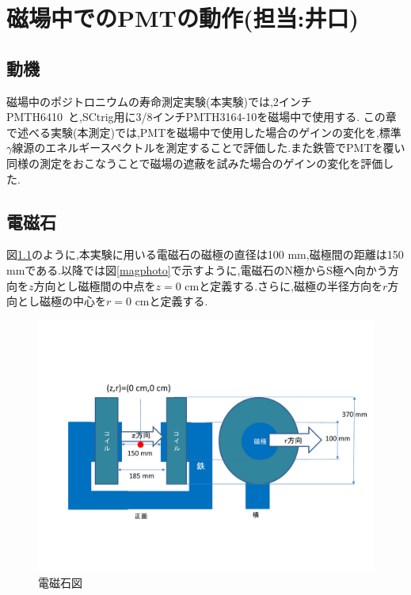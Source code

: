 \chapter{磁場中でのPMTの動作(担当:井口)}\label{PMT}


\section{動機}
磁場中のポジトロニウムの寿命測定実験(本実験)では,2インチPMT\hspace{3pt}H6410~\cite{pmtH6410}と,SCtrig用に3/8インチPMT\hspace{3pt}H3164-10\cite{pmtH3164-10}を磁場中で使用する.
この章で述べる実験(本測定)では,PMTを磁場中で使用した場合のゲインの変化を,標準$\gamma$線源のエネルギースペクトルを測定することで評価した.また鉄管でPMTを覆い同様の測定をおこなうことで磁場の遮蔽を試みた場合のゲインの変化を評価した.


\section{電磁石}
図\ref{magfigure}のように,本実験に用いる電磁石の磁極の直径は100 mm,磁極間の距離は150 mmである.以降では図\ref{magphoto}で示すように,電磁石のN極からS極へ向かう方向を$z$方向とし磁極間の中点を$z=0$ cmと定義する.さらに,磁極の半径方向を$r$方向とし磁極の中心を$r=0$ cmと定義する.

\begin{figure}[tbp]
	\centering
	\includegraphics[width=13cm]{fig/iguchi/magnetfigure.pdf}
	\caption{電磁石図}
	\label{magfigure}
\end{figure}

